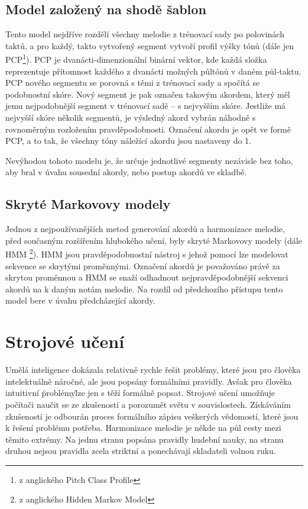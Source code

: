 \section{Model založený na shodě šablon}
\label{shodaSablon}
Tento model nejdříve rozdělí všechny melodie z trénovací sady po polovinách taktů, 
a pro každý, takto vytvořený segment vytvoří profil výšky tónů 
(dále jen PCP\footnote{z anglického Pitch Class Profile}).
\cite{YinCheng_comparativeStudy}
PCP je dvanácti-dimenzionální binární vektor, 
kde každá složka reprezentuje přítomnost každého z dvanácti možných půltónů v daném půl-taktu.
\cite{fujishima}
PCP nového segmentu se porovná s těmi z trénovací sady
a spočítá se podobnostní skóre.
Nový segment je pak označen takovým akordem,
který měl jemu nejpodobnější segment v trénovací sadě -- s nejvyšším skóre.
Jestliže má nejvyšší skóre několik segmentů,
je výsledný akord vybrán náhodně s rovnoměrným rozložením pravděpodobnosti.
Označení akordu je opět ve formě PCP, a to tak,
že všechny tóny náležící akordu jsou nastaveny do 1.
\par

Nevýhodou tohoto modelu je, že určuje jednotlivé segmenty nezávisle bez toho,
aby bral v úvahu sousední akordy, nebo postup akordů ve skladbě.
\cite{YinCheng_comparativeStudy}

\section{Skryté Markovovy modely}
Jednou z nejpoužívanějších metod generování akordů a harmonizace melodie, 
před současným rozšířením hlubokého učení, byly skryté Markovovy modely 
(dále HMM \footnote{z anglického Hidden Markov Model}).
HMM jsou pravděpodobnostní nástroj s jehož pomocí lze modelovat sekvence se skrytými proměnnými.
Označení akordů je považováno právě za skrytou proměnnou a 
HMM se snaží odhadnout nejpravděpodobnější sekvenci akordů na k daným notám melodie.
Na rozdíl od předchozího přístupu tento model bere v úvahu předcházející akordy.
\cite{YinCheng_comparativeStudy}

\chapter{Strojové učení}
Umělá inteligence dokázala relativně rychle řešit problémy, 
které jsou pro člověka intelektuálně náročné, 
ale jsou popsány formálními pravidly.
Avšak pro člověka intuitivní \"problémy\" lze jen s těží formálně popsat.
Strojové učení umožňuje počítači naučit se ze zkušeností
a porozumět světu v souvislostech.
Získáváním zkušeností je odbourán proces formálního zápisu veškerých vědomostí,
které jsou k řešení problému potřeba.
\cite{Goodfellow-et-al-2016}
Harmonizace melodie je někde na půl cesty mezi těmito extrémy.
Na jednu stranu popsána pravidly hudební nauky,
na stranu druhou nejsou pravidla zcela striktní 
a ponechávají skladateli volnou ruku.
\par

